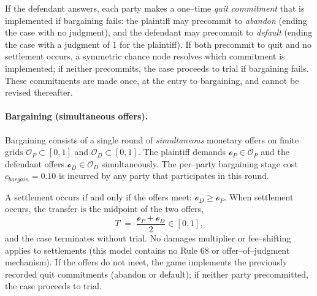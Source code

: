 \documentclass{article}
\begin{document}
If the defendant answers, each party makes a one–time \emph{quit commitment} that is implemented if bargaining fails: the plaintiff may precommit to \emph{abandon} (ending the case with no judgment), and the defendant may precommit to \emph{default} (ending the case with a judgment of $1$ for the plaintiff). If both precommit to quit and no settlement occurs, a symmetric chance node resolves which commitment is implemented; if neither precommits, the case proceeds to trial if bargaining fails. These commitments are made once, at the entry to bargaining, and cannot be revised thereafter.

\paragraph{Bargaining (simultaneous offers).}
Bargaining consists of a single round of \emph{simultaneous} monetary offers on finite grids $\mathcal{O}_P\subset[0,1]$ and $\mathcal{O}_D\subset[0,1]$. The plaintiff demands $\mathcal{o}_P\in\mathcal{O}_P$ and the defendant offers $\mathcal{o}_D\in\mathcal{O}_D$ simultaneously. The per–party bargaining stage cost $c_{bargain}=0.10$ is incurred by any party that participates in this round.

A settlement occurs if and only if the offers meet: $\mathcal{o}_D\ge \mathcal{o}_P$. When settlement occurs, the transfer is the midpoint of the two offers,
\[
T \;=\; \frac{\mathcal{o}_P+\mathcal{o}_D}{2}\in[0,1],
\]
and the case terminates without trial. No damages multiplier or fee–shifting applies to settlements (this model contains no Rule 68 or offer–of–judgment mechanism). If the offers do not meet, the game implements the previously recorded quit commitments (abandon or default); if neither party precommitted, the case proceeds to trial.
\end{document}
